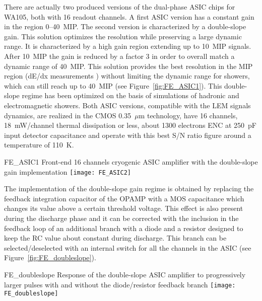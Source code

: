 There are actually two produced versions of the dual-phase ASIC
chips for WA105, both with 16 readout channels. A first ASIC version
has a constant gain in the region 0--40~MIP. The second version is
characterized by a double-slope gain. This solution optimizes the
resolution while preserving a large dynamic range. It is characterized
by a high gain region extending up to 10~MIP signals. After 10~MIP the
gain is reduced by a factor 3 in order to overall match a dynamic
range of 40~MIP. This solution provides the best resolution in the
MIP region (dE/dx measurements ) without limiting the dynamic range
for showers, which can still reach up to 40~MIP (see
Figure~\ref{fig:FE_ASIC1}). This double-slope regime has been
optimized on the basis of simulations of hadronic and electromagnetic
showers. Both ASIC versions, compatible with the LEM signals dynamics,
are realized in the CMOS 0.35~$\mu$m technology, have 16 channels,
18~mW/channel thermal dissipation or less, about 1300 electrons ENC at
250~pF input detector capacitance and operate with this best S/N ratio
figure around a temperature of 110~K.
\begin{cdrfigure}{FE_ASIC1}
{Front-end 16 channels cryogenic ASIC amplifier with the double-slope gain implementation}
\texttt{[image: FE\_ASIC2]}
\end{cdrfigure}

The implementation of the double-slope gain regime is obtained by
replacing the feedback integration capacitor of the OPAMP with a MOS
capacitance which changes its value above a certain threshold
voltage. This effect is also present during the discharge phase and it
can be corrected with the inclusion in the feedback loop of an
additional branch with a diode and a resistor designed to keep the RC
value about constant during discharge. This branch can be
selected/deselected with an internal switch for all the channels in
the ASIC (see Figure~\ref{fig:FE_doubleslope}).
\begin{cdrfigure}{FE_doubleslope}
{Response of the double-slope ASIC amplifier to progressively larger 
pulses with and without the diode/resistor feedback branch}
\texttt{[image: FE\_doubleslope]}
\end{cdrfigure}

